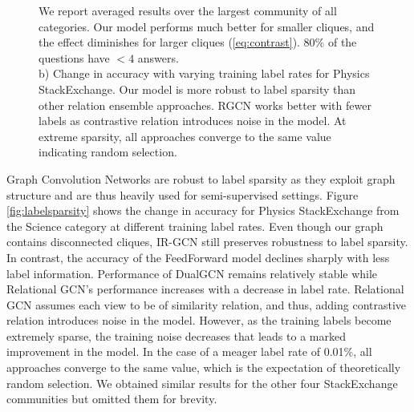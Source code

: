 \begin{figure}[tbh]
{We report averaged results over the largest community of all categories. Our model performs much better for smaller cliques, and the effect diminishes for larger cliques (\cref{eq:contrast}). 80\% of the questions have $< 4$ answers. \\
b) Change in accuracy with varying training label rates for Physics StackExchange. Our model is more robust to label sparsity than other relation ensemble approaches. RGCN works better with fewer labels as contrastive relation introduces noise in the model. At extreme sparsity, all approaches converge to the same value indicating random selection.
}
\end{figure}
Graph Convolution Networks are robust to label sparsity as they exploit graph structure and are thus heavily used for semi-supervised settings. Figure \ref{fig:labelsparsity} shows the change in accuracy for Physics StackExchange from the Science category at different training label rates. Even though our graph contains disconnected cliques, IR-GCN still preserves robustness to label sparsity.
In contrast, the accuracy of the FeedForward model declines sharply with less label information. Performance of DualGCN remains relatively stable while Relational GCN's performance increases with a decrease in label rate. Relational GCN assumes each view to be of similarity relation, and thus, adding contrastive relation introduces noise in the model. However, as the training labels become extremely sparse, the training noise decreases that leads to a marked improvement in the model. In the case of a meager label rate of 0.01\%, all approaches converge to the same value, which is the expectation of theoretically random selection. We obtained similar results for the other four StackExchange communities but omitted them for brevity.


